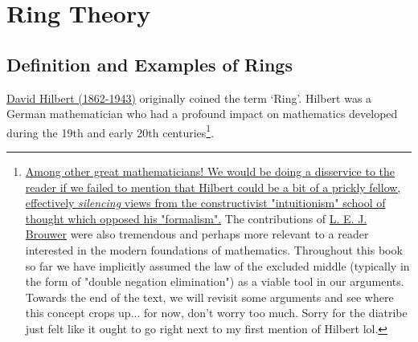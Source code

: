 



\chapter{Ring Theory}

\section{Definition and Examples of Rings}
\href{https://en.wikipedia.org/wiki/David_Hilbert}{David Hilbert (1862-1943)} originally coined the term `Ring'. Hilbert was a German mathematician who had a profound impact on mathematics developed during the 19th and early 20th centuries\footnote{\href{https://en.wikipedia.org/wiki/Brouwer\%E2\%80\%93Hilbert_controversy}{Among other great mathematicians! We would be doing a disservice to the reader if we failed to mention that Hilbert could be a bit of a prickly fellow, effectively \textit{silencing} views from the constructivist "intuitionism" school of thought which opposed his "formalism".} The contributions of \href{https://en.wikipedia.org/wiki/L._E._J._Brouwer}{L. E. J. Brouwer} were also tremendous and perhaps more relevant to a reader interested in the modern foundations of mathematics. Throughout this book so far we have implicitly assumed the law of the excluded middle (typically in the form of "double negation elimination") as a viable tool in our arguments. Towards the end of the text, we will revisit some arguments and see where this concept crops up... for now, don't worry too much. Sorry for the diatribe just felt like it ought to go right next to my first mention of Hilbert lol.}. 

